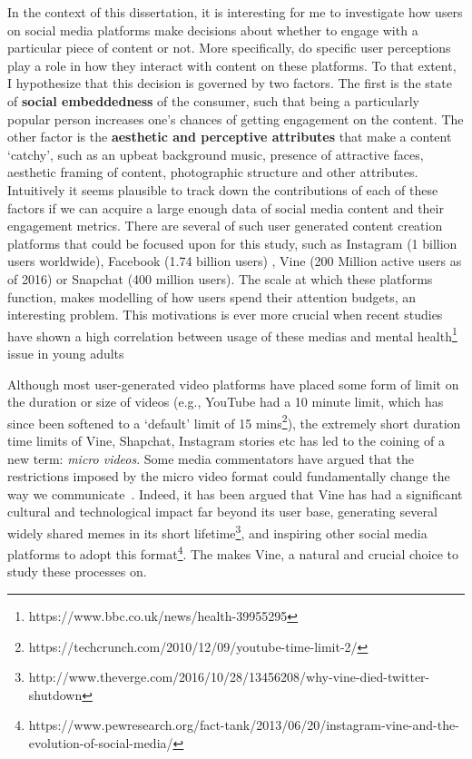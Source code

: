 In the context of this dissertation, it is interesting for me to investigate how users on social media platforms make decisions about whether to engage with a particular piece of content or not. More specifically, do specific user perceptions play a role in how they interact with content on these platforms. To that extent, I hypothesize that this decision is governed by two factors. The first is the state of \textbf{social embeddedness} of the consumer, such that being a particularly popular person increases one's chances of getting engagement on the content. The other factor is the \textbf{aesthetic and perceptive attributes} that make a content `catchy', such as an upbeat background music, presence of attractive faces, aesthetic framing of content, photographic structure and other attributes. Intuitively it seems plausible to track down the contributions of each of these factors if we can acquire a large enough data of social media content and their engagement metrics. There are several of such user generated content creation platforms that could be focused upon for this study, such as Instagram (1 billion users worldwide), Facebook (1.74 billion users) , Vine (200 Million active users as of 2016) or Snapchat (400 million  users). The scale at which these platforms function, makes modelling of how users spend their attention budgets, an interesting problem. This motivations is ever more crucial when recent studies have shown a high correlation between usage of these medias and mental health\footnote{https://www.bbc.co.uk/news/health-39955295} issue in young adults\cite{lup2015instagram,holland2017strong}

Although most user-generated video platforms have placed some form of limit on the duration or size of videos (e.g., YouTube had a 10 minute limit, which has since been softened to a `default' limit of 15 mins\footnote{\scriptsize https://techcrunch.com/2010/12/09/youtube-time-limit-2/}), the extremely short duration time limits of Vine, Shapchat, Instagram stories etc has led to the coining of a new term: \emph{micro videos}. Some media commentators have argued that the restrictions imposed by the micro video format could fundamentally change the way we communicate~\cite{bbc}. Indeed, it has been argued that Vine has had a significant cultural and technological impact far beyond its user base, generating several widely shared memes in its short lifetime\footnote{\scriptsize http://www.theverge.com/2016/10/28/13456208/why-vine-died-twitter-shutdown}, and inspiring other social media platforms to adopt this format\footnote{https://www.pewresearch.org/fact-tank/2013/06/20/instagram-vine-and-the-evolution-of-social-media/}. The makes Vine, a natural and crucial choice to study these processes on.


